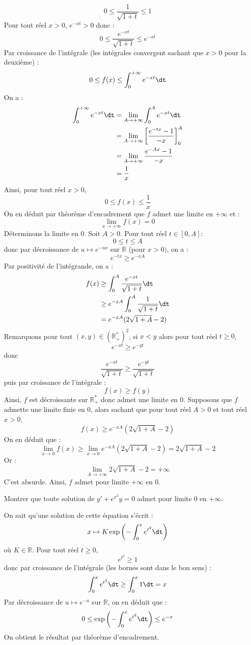 \documentclass[a4paper,10pt]{report}
\begin{document}
\begin{enumerate}
$$ 0 \leq \dfrac{1}{\sqrt{1+t}} \leq 1$$
Pour tout réel $x>0$, $e^{-xt} > 0$ donc :
$$  0 \leq \dfrac{e^{-xt}}{\sqrt{1+t}} \leq e^{-xt}$$
Par croissance de l'intégrale (les intégrales convergent sachant que $x>0$ pour la deuxième) :
$$ 0 \leq f(x) \leq \int_0^{+ \infty} e^{-xt} \dt$$
On a :
\begin{align*}
\int_0^{+ \infty} e^{-xt} \dt & =\lim_{A \rightarrow + \infty} \int_0^{A} e^{-xt} \dt \\
& = \lim_{A \rightarrow + \infty} \left[ \dfrac{e^{-tx}-1}{-x} \right]_0^A \\
&  = \lim_{A \rightarrow + \infty} \dfrac{e^{-Ax}-1}{-x} \\
& = \dfrac{1}{x}
\end{align*}
Ainsi, pour tout réel $x>0$,
$$ 0 \leq f(x) \leq \dfrac{1}{x}$$
On en déduit par théorème d'encadrement que $f$ admet une limite en $+ \infty$ et :
$$ \lim_{x \rightarrow + \infty} f(x) = 0$$
Déterminons la limite en $0$. Soit $A >0$. Pour tout réel $t \in [0,A]$:
$$ 0 \leq t \leq A$$
donc par décroissance de $u \mapsto e^{-ux}$ sur $\mathbb{R}$ (pour $x>0)$, on a :
$$  e^{-tx} \geq  e^{-xA}$$
Par positivité de l'intégrande, on a :
\begin{align*}
 f(x) & \geq \int_0^{A} \dfrac{e^{-xt}}{\sqrt{1+t}}  \dt  \\
 & \geq e^{-xA} \int_0^A \dfrac{1}{\sqrt{1+t}}  \dt  \\ 
 & = e^{-xA} (2 \sqrt{1+A}-2) 
\end{align*}
Remarquons pour tout $(x,y) \in (\mathbb{R}_+^*)^2$, si $x<y$ alors pour tout réel $t \geq 0$,
$$ e^{-xt} \geq e^{-yt}$$
donc 
$$ \dfrac{e^{-xt}}{\sqrt{1+t}} \geq \dfrac{e^{-yt}}{\sqrt{1+t}}$$
puis par croissance de l'intégrale :
$$ f(x) \geq f(y)$$
Ainsi, $f$ est décroissante sur $\mathbb{R}_+^*$ donc admet une limite en $0$. Supposons que $f$ admette une limite finie en $0$, alors sachant que pour tout réel $A>0$ et tout réel $x>0$,
$$ f(x) \geq  e^{-xA} (2 \sqrt{1+A}-2) $$
On en déduit que :
$$ \lim_{x \rightarrow 0} f(x) \geq \lim_{x \rightarrow 0} e^{-xA} (2 \sqrt{1+A}-2) = 2 \sqrt{1+A}-2$$
Or :
$$ \lim_{A \rightarrow + \infty} 2 \sqrt{1+A}-2 = + \infty$$
C'est absurde. Ainsi, $f$ admet pour limite $+ \infty$ en $0$.
\end{enumerate}

\begin{Exa} Montrer que toute solution de $y'+ e^{x^2} y=0$ admet pour limite $0$ en $+ \infty$.
\end{Exa}

\corr On sait qu'une solution de cette équation s'écrit :
$$x \mapsto K \exp \left( - \int_0^x e^{t^2} \dt \right)$$
où $K \in \mathbb{R}$. Pour tout réel $t \geq 0$,
$$ e^{t^2} \geq 1$$
donc par croissance de l'intégrale (les bornes sont dans le bon sens) :
$$ \int_0^x e^{t^2} \dt \geq \int_0^x 1 \dt = x$$
Par décroissance de $u \mapsto e^{-u}$ sur $\mathbb{R}$, on en déduit que :
$$  0 \leq \exp \left( - \int_0^x e^{t^2} \dt \right) \leq e^{-x}$$
On obtient le résultat par théorème d'encadrement.
\end{document}
